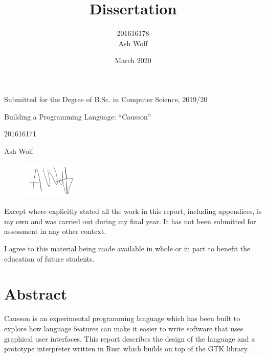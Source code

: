 \documentclass[11pt]{report}
\title{Dissertation}
\author{201616178\\Ash Wolf}
\date{March 2020}
\begin{document}
\DefineShortVerb{\|}


\begin{titlepage}
\begin{center}
    \vspace*{1cm}
    \Large Submitted for the Degree of B.Sc. in Computer Science, 2019/20
    
    \vspace{2cm}
    \Huge Building a Programming Language: ``Causson''
    
    \vspace{0.5cm}
    \Large 201616171
    
    \LARGE Ash Wolf
    
    \vfill
\end{center}

\begingroup
\parindent=0cm
\begin{figure}
\vspace{-0.5cm}
\includegraphics[width=0.25\textwidth]{sig.png}
\end{figure}

\normalsize Except where explicitly stated all the work in this report, including appendices, is my own and was carried out during my final year. It has not been submitted for assessment in any other context.
    
\vspace{0.25cm}
    
\normalsize I agree to this material being made available in whole or in part to benefit the education of future students.

\endgroup
\end{titlepage}

\chapter*{Abstract}

Causson is an experimental programming language which has been built to explore how language features can make it easier to write software that uses graphical user interfaces. This report describes the design of the language and a prototype interpreter written in Rust which builds on top of the GTK library.
\end{document}
